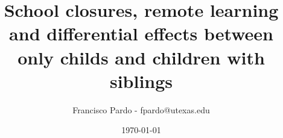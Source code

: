 \documentclass{beamer}
\title[]{School closures, remote learning and differential effects between only childs and children with siblings}
\author[Francisco Pardo] %
{Francisco Pardo - fpardo@utexas.edu \inst{1}}
\institute[UT] %
{
  \inst{1}%
  University of Texas at Austin
}
\date{\today}
\begin{document}
\frame{\titlepage}

\end{document}
